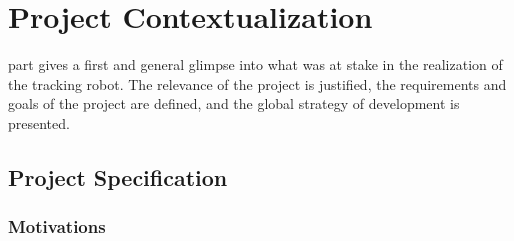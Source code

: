 \clearpage
{}

\chapter{Project Contextualization}\label{context}

	 part gives a first and general glimpse into what was at stake in 
	the realization of the tracking robot. The relevance of the 
	project is justified, the requirements and goals of the project
	are defined, and the global strategy of development is
	presented.

	\section{Project Specification}
	
		\subsection{Motivations}
	
